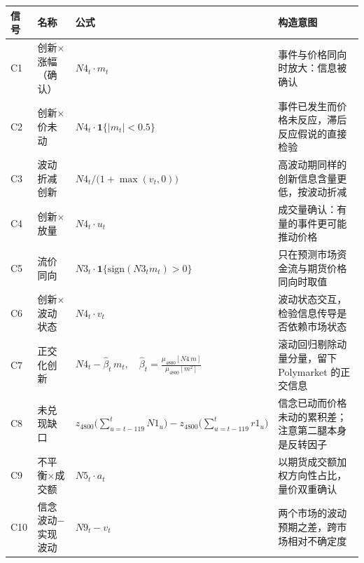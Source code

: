 \setlength{\tabcolsep}{4pt}
\begin{tabular}{llp{6.4cm}p{4.5cm}}
\toprule
信号 & 名称 & 公式 & 构造意图 \\
\midrule
C1 & 创新$\times$涨幅（确认） & $\displaystyle N4_t\cdot m_t$ & 事件与价格同向时放大：信息被确认 \\
C2 & 创新$\times$价未动 & $\displaystyle N4_t\cdot\mathbf{1}\{|m_t|<0.5\}$ & 事件已发生而价格未反应，滞后反应假说的直接检验 \\
C3 & 波动折减创新 & $\displaystyle N4_t\big/\big(1+\max(v_t,0)\big)$ & 高波动期同样的创新信息含量更低，按波动折减 \\
C4 & 创新$\times$放量 & $\displaystyle N4_t\cdot u_t$ & 成交量确认：有量的事件更可能推动价格 \\
C5 & 流价同向 & $\displaystyle N3_t\cdot\mathbf{1}\{\mathrm{sign}(N3_t m_t)>0\}$ & 只在预测市场资金流与期货价格同向时取值 \\
C6 & 创新$\times$波动状态 & $\displaystyle N4_t\cdot v_t$ & 波动状态交互，检验信息传导是否依赖市场状态 \\
C7 & 正交化创新 & $\displaystyle N4_t-\hat\beta_t\, m_t,\quad \hat\beta_t=\tfrac{\mu_{4800}[N4\,m]}{\mu_{4800}[m^2]}$ & 滚动回归剔除动量分量，留下 Polymarket 的正交信息 \\
C8 & 未兑现缺口 & $\displaystyle z_{4800}\!\Big(\sum_{u=t-119}^{t} N1_u\Big)-z_{4800}\!\Big(\sum_{u=t-119}^{t} r1_u\Big)$ & 信念已动而价格未动的累积差；注意第二腿本身是反转因子 \\
C9 & 不平衡$\times$成交额 & $\displaystyle N5_t\cdot a_t$ & 以期货成交额加权方向性占比，量价双重确认 \\
C10 & 信念波动$-$实现波动 & $\displaystyle N9_t-v_t$ & 两个市场的波动预期之差，跨市场相对不确定度 \\
\bottomrule
\end{tabular}
